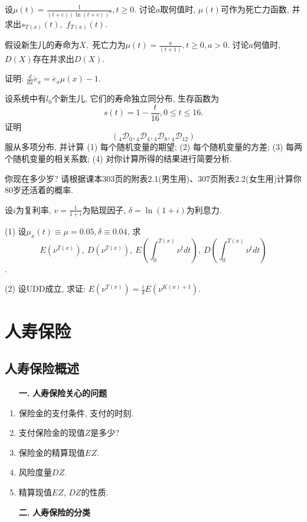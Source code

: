\documentclass[a4paper,openany, 10pt]{ctexbook}
\newcommand{\hei}{\CJKfamily{hei}}      %
\def\z{\left}
\def\y{\right}
\begin{document}
\begin{exs}
    设$\mu(t)=\frac{1}{(t+e)(\ln (t+e))^a},t\ge0.$ 讨论$a$取何值时, $\mu(t)$可作为死亡力函数, 并求出$s_{T(x)}(t),$ $f_{T(x)}(t).$
\end{exs}

\begin{exs}
    假设新生儿的寿命为$X,$ 死亡力为$\mu(t)=\frac{a}{(t+1)},t\ge0, a>0.$ 讨论$a$何值时, $D(X)$存在并求出$D(X).$
\end{exs}

\begin{exs}
    证明: $\frac{d}{dx}\mathring e_x=\mathring e_x\mu(x)-1.$
\end{exs}

\begin{exs}设系统中有$l_0$个新生儿, 它们的寿命独立同分布, 生存函数为
    $$s(t)=1-\frac{t}{16}, 0\le t\le 16.$$ 证明$$({}_4\mathscr D_0, {}_4\mathscr D_4,{}_{4}\mathscr D_8, {}_{4}\mathscr D_{12})$$服从多项分布, 并计算 (1) 每个随机变量的期望; (2) 每个随机变量的方差; (3) 每两个随机变量的相关系数; (4) 对你计算所得的结果进行简要分析.
\end{exs}

\begin{exs}
    你现在多少岁? 请根据课本303页的附表2.1(男生用)、307页附表2.2(女生用)计算你80岁还活着的概率.
\end{exs}

\begin{exs}
    设$i$为复利率, $v=\frac{1}{1+i}$为贴现因子, $\delta=\ln (1+i)$为利息力.

    (1) 设$\mu_{x}(t)\equiv \mu =0.05, \delta\equiv 0.04$,
    求 $$E(\nu^{T(x)}),\ D(\nu^{T(x)}),\ E\z(\int_{0}^{T(x)}\nu^{t}dt\y),\ D\z(\int_{0}^{T(x)}\nu^{t}dt\y)$$.

    (2) 设UDD成立, 求证: $E(\nu^{T(x)})=\frac{i}{\delta}E\z(\nu^{K(x)+1}\y)$.
\end{exs}


\chapter{人寿保险}
\section{人寿保险概述}
\begin{itemize}
    \item[{\bf\hei 一.}]{\bf\hei 人寿保险关心的问题}
\end{itemize}
\begin{enumerate}
    \item 保险金的支付条件, 支付的时刻.
    \item 支付保险金的现值$Z$是多少?
    \item 保险金的精算现值$EZ$.
    \item 风险度量$DZ$.
    \item 精算现值$EZ$, $DZ$的性质.
\end{enumerate}
\begin{itemize}
    \item[{\bf\hei 二.}]{\bf\hei 人寿保险的分类}
\end{itemize}
\end{document}
